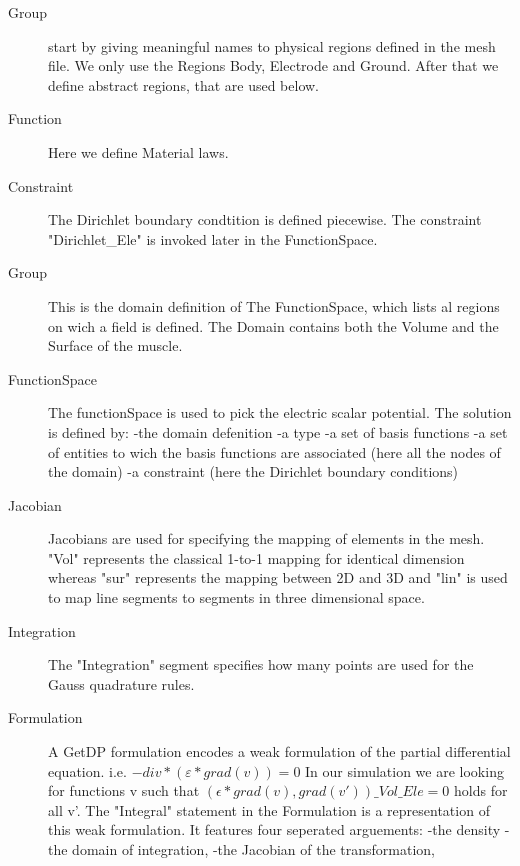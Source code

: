 \documentclass[preprint,journal]{vgtc}       %
\begin{document}
\begin{description}
	\item[Group]
	start by giving meaningful names to physical regions defined in the mesh file.
	We only use the Regions Body, Electrode and Ground. After that we define abstract regions, that are used below.
	\item[Function]
	Here we define Material laws.
	\item[Constraint]
	The Dirichlet boundary condtition is defined piecewise. The constraint "Dirichlet\_Ele" is invoked later in the FunctionSpace.
	\item[Group]
	This is the domain definition of The FunctionSpace, which lists al regions on wich a field is defined. The Domain contains both the Volume and the Surface of the muscle.
	\item[FunctionSpace]
	The functionSpace is used to pick the electric scalar potential. The solution is defined  by:\newline
	-the domain defenition\newline
	-a type\newline
	-a set of basis functions\newline
	-a set of entities to wich the basis functions are associated (here all the nodes of the domain)\newline
	-a constraint (here the Dirichlet boundary conditions)\newline
	\item[Jacobian]
	Jacobians are used for specifying the mapping of elements in the mesh.
	"Vol" represents the classical 1-to-1 mapping for identical dimension whereas
	"sur" represents the mapping between 2D and 3D and "lin" is used to map line segments to segments in three dimensional space.
	\item[Integration]
	The "Integration" segment specifies how many points are used for the Gauss quadrature rules.
	\item[Formulation]
	A GetDP formulation encodes a weak formulation of the partial differential equation. i.e. 
	${-div}*(\varepsilon *grad{(v)}) = 0$
	In our simulation we are looking for functions v such that 
	$({\epsilon * grad {(v)}, grad {(v')}}) \_Vol\_Ele =  0$
	holds for all v'.
	The "Integral" statement in the Formulation is a representation of this weak formulation. It features four seperated arguements:
	-the density\newline
	-the domain of integration, \newline
	-the Jacobian of the transformation, \newline

\end{description}
\end{document}
